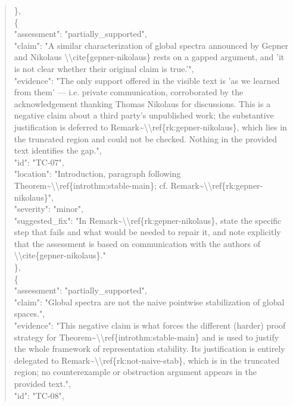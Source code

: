 \documentclass[11pt]{article}
\begin{document}
\begin{quote}
    \},\\
    \{\\
      "assessment": "partially\_supported",\\
      "claim": "A similar characterization of global spectra announced by Gepner and Nikolaus \textbackslash{}\textbackslash{}cite\{gepner-nikolaus\} rests on a gapped argument, and 'it is not clear whether their original claim is true.'",\\
      "evidence": "The only support offered in the visible text is 'as we learned from them' --- i.e. private communication, corroborated by the acknowledgement thanking Thomas Nikolaus for discussions. This is a negative claim about a third party's unpublished work; the substantive justification is deferred to Remark\~{}\textbackslash{}\textbackslash{}ref\{rk:gepner-nikolaus\}, which lies in the truncated region and could not be checked. Nothing in the provided text identifies the gap.",\\
      "id": "TC-07",\\
      "location": "Introduction, paragraph following Theorem\~{}\textbackslash{}\textbackslash{}ref\{introthm:stable-main\}; cf. Remark\~{}\textbackslash{}\textbackslash{}ref\{rk:gepner-nikolaus\}",\\
      "severity": "minor",\\
      "suggested\_fix": "In Remark\~{}\textbackslash{}\textbackslash{}ref\{rk:gepner-nikolaus\}, state the specific step that fails and what would be needed to repair it, and note explicitly that the assessment is based on communication with the authors of \textbackslash{}\textbackslash{}cite\{gepner-nikolaus\}."\\
    \},\\
    \{\\
      "assessment": "partially\_supported",\\
      "claim": "Global spectra are not the naive pointwise stabilization of global spaces.",\\
      "evidence": "This negative claim is what forces the different (harder) proof strategy for Theorem\~{}\textbackslash{}\textbackslash{}ref\{introthm:stable-main\} and is used to justify the whole framework of representation stability. Its justification is entirely delegated to Remark\~{}\textbackslash{}\textbackslash{}ref\{rk:not-naive-stab\}, which is in the truncated region; no counterexample or obstruction argument appears in the provided text.",\\
      "id": "TC-08",\\

\end{quote}
\end{document}
